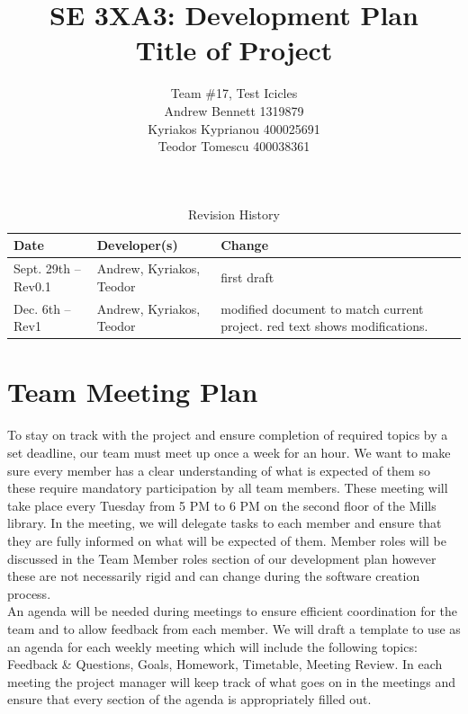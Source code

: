 \documentclass{article}
\title{SE 3XA3: Development Plan\\Title of Project}
\author{Team \#17, Test Icicles
		\\ Andrew Bennett 1319879
		\\ Kyriakos Kyprianou  400025691
		\\ Teodor Tomescu 400038361
}
\date{}
\begin{document}
\begin{table}[hp]
\caption{Revision History} \label{TblRevisionHistory}
\begin{tabularx}{\textwidth}{llX}
\toprule
\textbf{Date} & \textbf{Developer(s)} & \textbf{Change}\\
\midrule
Sept. 29th -- Rev0.1 	& Andrew, Kyriakos, Teodor & first draft \\
Dec. 6th  -- Rev1		& Andrew, Kyriakos, Teodor & modified document to match current project. red text shows modifications.\\

\bottomrule
\end{tabularx}
\end{table}

\newpage

\maketitle
\newpage

\section{Team Meeting Plan}

To stay on track with the project and ensure completion of required topics by a set deadline, our team must meet up once a week for an hour. We want to make sure every member has a clear understanding of what is expected of them so these require mandatory participation by all team members. These meeting will take place every Tuesday from 5 PM to 6 PM on the second floor of the Mills library. In the meeting, we will delegate tasks to each member and ensure that they are fully informed on what will be expected of them. Member roles will be discussed in the Team Member roles section of our development plan however these are not necessarily rigid and can change during the software creation process. \\

\noindent An agenda will be needed during meetings to ensure efficient coordination for the team and to allow feedback from each member. We will draft a template to use as an agenda for each weekly meeting which will include the following topics: Feedback \& Questions, Goals, Homework, Timetable, Meeting Review. In each meeting the project manager will keep track of what goes on in the meetings and ensure that every section of the agenda is appropriately filled out.
\end{document}
